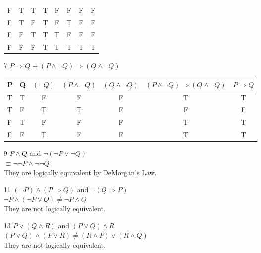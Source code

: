 \documentclass[12pt]{article}
\begin{document}
\begin{enumerate}
\begin{tabular}{l|l|l|c|c|c|c|c}
		F & T & T & T   & F    & F    & F & F \\
		F & T & F & T   & F    & T    & F & F \\
		F & F & T & T   & T    & F    & F & F \\
		F & F & F & T   & T    & T    & T & T \\
		\hline
	    \end{tabular}
    \item [7] $P\Rightarrow Q \equiv (P \land \neg Q) \Rightarrow (Q \land \neg Q)$\\
	    \begin{tabular}{l|l|c|c|c|c|c}
		\hline
		P & Q & $(\neg Q)$ & $(P \land \neg Q)$ & $(Q \land \neg Q)$ & $ (P \land \neg Q) \Rightarrow (Q \land \neg Q)$ & $P\Rightarrow Q$\\
		\hline
		T & T & F     & F         & F & T & T \\
		T & F & T     & T         & F & F & F \\
		F & T & F     & F         & F & T & T \\
		F & F & T     & F         & F & T & T \\
		\hline
	    \end{tabular}
	\item [9] $P \land Q$ and $\neg(\neg P \lor \neg Q)$\\
	    $\equiv \neg\neg P \land \neg \neg Q$\\
	    They are logically equivalent by DeMorgan's Law.
	\item [11] $(\neg P) \land (P \Rightarrow Q)$ and $\neg (Q \Rightarrow P)$\\
	    $\neg P \land (\neg P \lor Q) \neq \neg P \land Q$\\
	    They are not logically equivalent.
	\item [13] $P \lor (Q \land R)$ and $(P \lor Q) \land R$\\
	    $(P\lor Q) \land (P\lor R) \neq (R\land P) \lor (R \land Q)$\\
	    They are not logically equivalent.
\end{enumerate}
\end{document}

